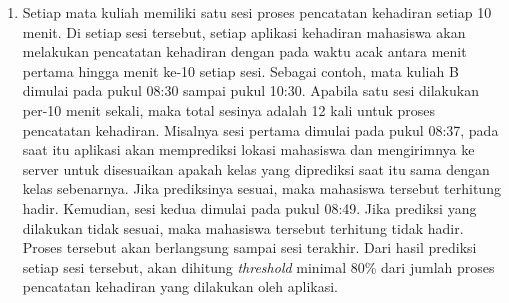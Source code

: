\begin{enumerate}[a.]
\begin{enumerate}[a.]
\begin{enumerate}[1.]
		            \vspace{2cm}
		      \item Setiap mata kuliah memiliki satu sesi proses pencatatan kehadiran setiap 10 menit. Di setiap sesi tersebut, setiap aplikasi kehadiran mahasiswa akan melakukan pencatatan kehadiran dengan pada waktu acak antara menit pertama hingga menit ke-10 setiap sesi. Sebagai contoh, mata kuliah B dimulai pada pukul 08:30 sampai pukul 10:30. Apabila satu sesi dilakukan per-10 menit sekali, maka total sesinya adalah 12 kali untuk proses pencatatan kehadiran. Misalnya sesi pertama dimulai pada pukul 08:37, pada saat itu aplikasi akan memprediksi lokasi mahasiswa dan mengirimnya ke server untuk disesuaikan apakah kelas yang diprediksi saat itu sama dengan kelas sebenarnya. Jika prediksinya sesuai, maka mahasiswa tersebut terhitung hadir. Kemudian, sesi kedua dimulai pada pukul 08:49. Jika prediksi yang dilakukan tidak sesuai, maka mahasiswa tersebut terhitung tidak hadir. Proses tersebut akan berlangsung sampai sesi terakhir. Dari hasil prediksi setiap sesi tersebut, akan dihitung \textit{threshold} minimal 80\% dari jumlah proses pencatatan kehadiran yang dilakukan oleh aplikasi.
	      \end{enumerate}


\end{enumerate}
\end{enumerate}
